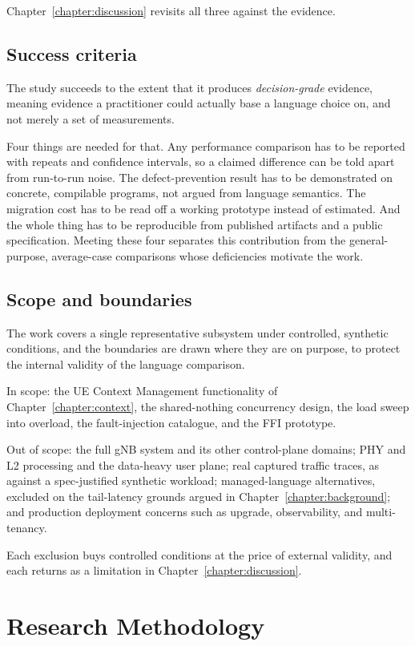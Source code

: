 \documentclass[english,twoside,openright,a4paper,censored,csm,software-track-2020]{HYthesisML}
\begin{document}
Chapter~\ref{chapter:discussion} revisits all three against the evidence.

\section{Success criteria}
The study succeeds to the extent that it produces \emph{decision-grade} evidence, meaning evidence
a practitioner could actually base a language choice on, and not merely a set of measurements.

Four things are needed for that. Any performance comparison has to be reported with repeats and
confidence intervals, so a claimed difference can be told apart from run-to-run noise. The
defect-prevention result has to be demonstrated on concrete, compilable programs, not argued from
language semantics. The migration cost has to be read off a working prototype instead of
estimated. And the whole thing has to be reproducible from published artifacts and a public
specification. Meeting these four separates this contribution from the general-purpose,
average-case comparisons whose deficiencies motivate the work.

\section{Scope and boundaries}
The work covers a single representative subsystem under controlled, synthetic conditions, and the
boundaries are drawn where they are on purpose, to protect the internal validity of the language
comparison.

In scope: the UE Context Management functionality of Chapter~\ref{chapter:context}, the
shared-nothing concurrency design, the load sweep into overload, the fault-injection catalogue,
and the FFI prototype.

Out of scope: the full gNB system and its other control-plane domains; PHY and L2 processing and
the data-heavy user plane; real captured traffic traces, as against a spec-justified synthetic
workload; managed-language alternatives, excluded on the tail-latency grounds argued in
Chapter~\ref{chapter:background}; and production deployment concerns such as upgrade,
observability, and multi-tenancy.

Each exclusion buys controlled conditions at the price of external validity, and each returns as
a limitation in Chapter~\ref{chapter:discussion}.

\chapter{Research Methodology\label{chapter:methodology}}
\end{document}
